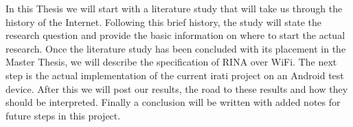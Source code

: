 \npar

In this Thesis we will start with a literature study that will take us through the history of the Internet. Following this brief history, the study will state the research question and provide the basic information on where to start the actual research. Once the literature study has been concluded with its placement in the Master Thesis, we will describe the specification of RINA over WiFi. The next step is the actual implementation of the current irati project on an Android test device. After this we will post our results, the road to these results and how they should be interpreted. Finally a conclusion will be written with added notes for future steps in this project.